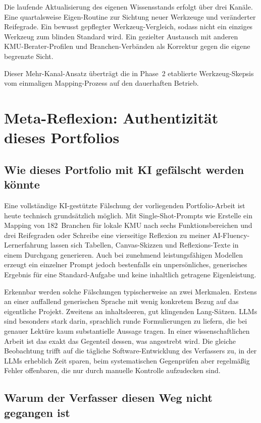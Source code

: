\documentclass[a4paper,11pt]{article}
\begin{document}
Die laufende Aktualisierung des eigenen Wissensstands erfolgt über
drei Kanäle. Eine quartalsweise Eigen-Routine zur Sichtung neuer
Werkzeuge und veränderter Reifegrade. Ein bewusst gepflegter
Werkzeug-Vergleich, sodass nicht ein einziges Werkzeug zum blinden
Standard wird. Ein gezielter Austausch mit anderen
KMU-Berater-Profilen und Branchen-Verbänden als Korrektur gegen die
eigene begrenzte Sicht.

Dieser Mehr-Kanal-Ansatz überträgt die in Phase~2 etablierte
Werkzeug-Skepsis vom einmaligen Mapping-Prozess auf den dauerhaften
Betrieb.

\section{Meta-Reflexion: Authentizität dieses Portfolios}

\subsection{Wie dieses Portfolio mit KI gefälscht werden könnte}

Eine vollständige KI-gestützte Fälschung der vorliegenden
Portfolio-Arbeit ist heute technisch grundsätzlich möglich. Mit
Single-Shot-Prompts wie \glqq{}Erstelle ein Mapping von 182~Branchen
für lokale KMU nach sechs Funktionsbereichen und drei
Reifegraden\grqq{} oder \glqq{}Schreibe eine vierseitige Reflexion zu
meiner AI-Fluency-Lernerfahrung\grqq{} lassen sich Tabellen,
Canvas-Skizzen und Reflexions-Texte in einem Durchgang generieren. Auch
bei zunehmend leistungsfähigen Modellen erzeugt ein einzelner Prompt
jedoch bestenfalls ein unpersönliches, generisches Ergebnis für eine
Standard-Aufgabe und keine inhaltlich getragene Eigenleistung.

Erkennbar werden solche Fälschungen typischerweise an zwei Merkmalen.
Erstens an einer auffallend generischen Sprache mit wenig konkretem
Bezug auf das eigentliche Projekt. Zweitens an inhaltsleeren, gut
klingenden Lang-Sätzen. LLMs sind besonders stark darin, sprachlich
runde Formulierungen zu liefern, die bei genauer Lektüre kaum
substantielle Aussage tragen. In einer wissenschaftlichen Arbeit ist
das exakt das Gegenteil dessen, was angestrebt wird. Die gleiche
Beobachtung trifft auf die tägliche Software-Entwicklung des Verfassers
zu, in der LLMs erheblich Zeit sparen, beim systematischen
Gegenprüfen aber regelmäßig Fehler offenbaren, die nur durch manuelle
Kontrolle aufzudecken sind.


\subsection{Warum der Verfasser diesen Weg nicht gegangen ist}
\end{document}
